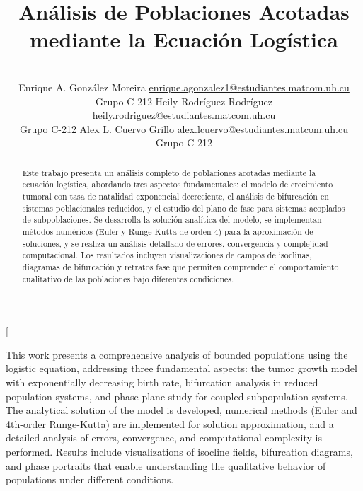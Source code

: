\documentclass[a4paper,10pt,twocolumn]{article}
\title{Análisis de Poblaciones Acotadas mediante la Ecuación Logística}
\author{\\
\name Enrique A. González Moreira \email \href{mailto:enrique.agonzalez1@estudiantes.matcom.uh.cu}{enrique.agonzalez1@estudiantes.matcom.uh.cu}
	\\ \addr Grupo C-212 \AND
\name Heily Rodríguez Rodríguez \email \href{mailto:heily.rodriguez@estudiantes.matcom.uh.cu}{heily.rodriguez@estudiantes.matcom.uh.cu}
  \\ \addr Grupo C-212 \AND
\name Alex L. Cuervo Grillo \email \href{mailto:alex.lcuervo@estudiantes.matcom.uh.cu}{alex.lcuervo@estudiantes.matcom.uh.cu}
  \\ \addr Grupo C-212}
\begin{document}
\twocolumn[

\maketitle


\begin{abstract}

	Este trabajo presenta un análisis completo de poblaciones acotadas mediante la ecuación logística, abordando tres aspectos fundamentales: el modelo de crecimiento tumoral con tasa de natalidad exponencial decreciente, el análisis de bifurcación en sistemas poblacionales reducidos, y el estudio del plano de fase para sistemas acoplados de subpoblaciones. Se desarrolla la solución analítica del modelo, se implementan métodos numéricos (Euler y Runge-Kutta de orden 4) para la aproximación de soluciones, y se realiza un análisis detallado de errores, convergencia y complejidad computacional. Los resultados incluyen visualizaciones de campos de isoclinas, diagramas de bifurcación y retratos fase que permiten comprender el comportamiento cualitativo de las poblaciones bajo diferentes condiciones.

\end{abstract}

\vspace{0.5cm}

\begin{enabstract}

  This work presents a comprehensive analysis of bounded populations using the logistic equation, addressing three fundamental aspects: the tumor growth model with exponentially decreasing birth rate, bifurcation analysis in reduced population systems, and phase plane study for coupled subpopulation systems. The analytical solution of the model is developed, numerical methods (Euler and 4th-order Runge-Kutta) are implemented for solution approximation, and a detailed analysis of errors, convergence, and computational complexity is performed. Results include visualizations of isocline fields, bifurcation diagrams, and phase portraits that enable understanding the qualitative behavior of populations under different conditions.

\end{enabstract}
\end{document}
